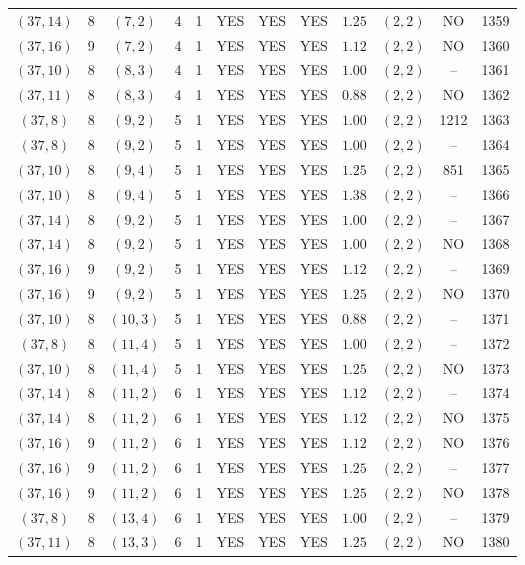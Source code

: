 \begin{longtable}{|c|c|c|c|c|c|c|c|c|c|c|c|}
$(37,14)$ & 8 & $(7,2)$ & 4 & 1 & YES & YES & YES & $1.25$ & $(2,2)$ & NO & 1359\\
$(37,16)$ & 9 & $(7,2)$ & 4 & 1 & YES & YES & YES & $1.12$ & $(2,2)$ & NO & 1360\\
$(37,10)$ & 8 & $(8,3)$ & 4 & 1 & YES & YES & YES & $1.00$ & $(2,2)$ & -- & 1361\\
$(37,11)$ & 8 & $(8,3)$ & 4 & 1 & YES & YES & YES & $0.88$ & $(2,2)$ & NO & 1362\\
$(37,8)$ & 8 & $(9,2)$ & 5 & 1 & YES & YES & YES & $1.00$ & $(2,2)$ & 1212 & 1363\\
$(37,8)$ & 8 & $(9,2)$ & 5 & 1 & YES & YES & YES & $1.00$ & $(2,2)$ & -- & 1364\\
$(37,10)$ & 8 & $(9,4)$ & 5 & 1 & YES & YES & YES & $1.25$ & $(2,2)$ & 851 & 1365\\
$(37,10)$ & 8 & $(9,4)$ & 5 & 1 & YES & YES & YES & $1.38$ & $(2,2)$ & -- & 1366\\
$(37,14)$ & 8 & $(9,2)$ & 5 & 1 & YES & YES & YES & $1.00$ & $(2,2)$ & -- & 1367\\
$(37,14)$ & 8 & $(9,2)$ & 5 & 1 & YES & YES & YES & $1.00$ & $(2,2)$ & NO & 1368\\
$(37,16)$ & 9 & $(9,2)$ & 5 & 1 & YES & YES & YES & $1.12$ & $(2,2)$ & -- & 1369\\
$(37,16)$ & 9 & $(9,2)$ & 5 & 1 & YES & YES & YES & $1.25$ & $(2,2)$ & NO & 1370\\
$(37,10)$ & 8 & $(10,3)$ & 5 & 1 & YES & YES & YES & $0.88$ & $(2,2)$ & -- & 1371\\
$(37,8)$ & 8 & $(11,4)$ & 5 & 1 & YES & YES & YES & $1.00$ & $(2,2)$ & -- & 1372\\
$(37,10)$ & 8 & $(11,4)$ & 5 & 1 & YES & YES & YES & $1.25$ & $(2,2)$ & NO & 1373\\
$(37,14)$ & 8 & $(11,2)$ & 6 & 1 & YES & YES & YES & $1.12$ & $(2,2)$ & -- & 1374\\
$(37,14)$ & 8 & $(11,2)$ & 6 & 1 & YES & YES & YES & $1.12$ & $(2,2)$ & NO & 1375\\
$(37,16)$ & 9 & $(11,2)$ & 6 & 1 & YES & YES & YES & $1.12$ & $(2,2)$ & NO & 1376\\
$(37,16)$ & 9 & $(11,2)$ & 6 & 1 & YES & YES & YES & $1.25$ & $(2,2)$ & -- & 1377\\
$(37,16)$ & 9 & $(11,2)$ & 6 & 1 & YES & YES & YES & $1.25$ & $(2,2)$ & NO & 1378\\
$(37,8)$ & 8 & $(13,4)$ & 6 & 1 & YES & YES & YES & $1.00$ & $(2,2)$ & -- & 1379\\
$(37,11)$ & 8 & $(13,3)$ & 6 & 1 & YES & YES & YES & $1.25$ & $(2,2)$ & NO & 1380\\

\end{longtable}
